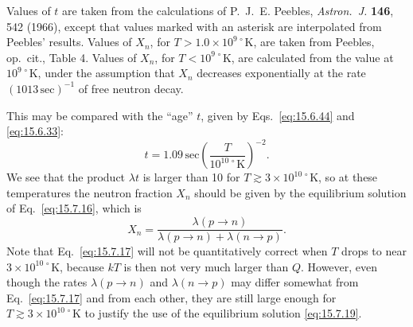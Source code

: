 \begin{table}[htbp]
  \vspace{0.5em}
  \begin{minipage}{0.92\linewidth}
    \footnotesize
    Values of \(t\) are taken from the calculations of P.~J.~E. Peebles,
    \emph{Astron.\ J.} \textbf{146}, 542 (1966), except that values marked
    with an asterisk are interpolated from Peebles' results. Values of
    \(X_n\), for \(T>1.0\times10^{9\,\circ}\mathrm K\), are taken from
    Peebles, op.\ cit., Table 4. Values of \(X_n\), for
    \(T<10^{9\,\circ}\mathrm K\), are calculated from the value at
    \(10^{9\,\circ}\mathrm K\), under the assumption that \(X_n\) decreases
    exponentially at the rate \((1013\,\mathrm{sec})^{-1}\) of free neutron
    decay.
  \end{minipage}
\end{table}
\endgroup

This may be compared with the ``age'' \(t\), given by
Eqs.~\eqref{eq:15.6.44} and \eqref{eq:15.6.33}:
\begin{equation}
  t
  =
  1.09\,\mathrm{sec}
  \left(
    \frac{T}{10^{10\,\circ}\mathrm K}
  \right)^{-2}.
  \tag{15.7.18}\label{eq:15.7.18}
\end{equation}
We see that the product \(\lambda t\) is larger than 10 for
\(T\gtrsim3\times10^{10\,\circ}\mathrm K\), so at these temperatures the
neutron fraction \(X_n\) should be given by the equilibrium solution of
Eq.~\eqref{eq:15.7.16}, which is
\begin{equation}
  X_n
  =
  \frac{\lambda(p\to n)}
       {\lambda(p\to n)+\lambda(n\to p)}.
  \tag{15.7.19}\label{eq:15.7.19}
\end{equation}
Note that Eq.~\eqref{eq:15.7.17} will not be quantitatively correct when
\(T\) drops to near \(3\times10^{10\,\circ}\mathrm K\), because \(kT\) is
then not very much larger than \(Q\). However, even though the rates
\(\lambda(p\to n)\) and \(\lambda(n\to p)\) may differ somewhat from
Eq.~\eqref{eq:15.7.17} and from each other, they are still large enough for
\(T\gtrsim3\times10^{10\,\circ}\mathrm K\) to justify the use of the
equilibrium solution \eqref{eq:15.7.19}.

